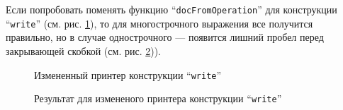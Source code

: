 Если попробовать поменять функцию “\lstinline[language=Haskell]{docFromOperation}” для конструкции “\lstinline[language=llang]{write}” (см. рис. \ref{fig:lHughesWriteChange}),
то для многострочного выражения все получится правильно, но в случае однострочного --- появится лишний пробел перед закрывающей скобкой (см. рис. \ref{fig:lBadWriteEx})).

\begin{figure}[h!]
	
	\caption{Измененный принтер конструкции “\lstinline[language=llang]{write}”}
	\label{fig:lHughesWriteChange}
\end{figure}

\begin{figure}[h!]
	
	\caption{Результат для измененого принтера конструкции “\lstinline[language=llang]{write}”}
	\label{fig:lBadWriteEx}
\end{figure}
